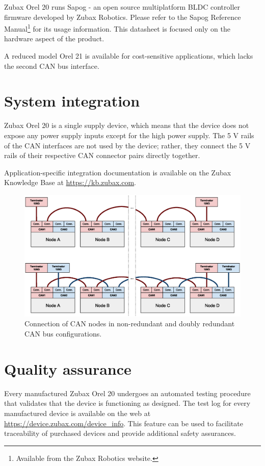 \documentclass{zubaxdoc}
\begin{document}
Zubax Orel 20 runs Sapog - an open source multiplatform BLDC controller firmware
developed by Zubax Robotics.
Please refer to the Sapog Reference Manual\footnote{Available from the Zubax Robotics website.}
for its usage information.
This datasheet is focused only on the hardware aspect of the product.

A reduced model Orel 21 is available for cost-sensitive applications, which lacks the second CAN bus interface.

\section{System integration}

Zubax Orel 20 is a single supply device, which means that the device does
not expose any power supply inputs except for the high power supply.
The 5 V rails of the CAN interfaces are not used by the device; rather,
they connect the 5 V rails of their respective CAN connector pairs directly together.

Application-specific integration documentation is available on the Zubax Knowledge Base at
\mbox{\url{https://kb.zubax.com}}.

\begin{figure}[hb]
    \centering
	\includegraphics[width=\textwidth]{can_daisy_chain}
	\caption{Connection of CAN nodes in non-redundant and doubly redundant CAN bus configurations.
	\label{can_daisy_chain_non_redundant}}
\end{figure}

\section{Quality assurance}

Every manufactured Zubax Orel 20 undergoes an automated testing procedure that validates that
the device is functioning as designed.
The test log for every manufactured device is available on the web at
\url{https://device.zubax.com/device_info}.
This feature can be used to facilitate traceability of purchased devices and
provide additional safety assurances.
\end{document}
